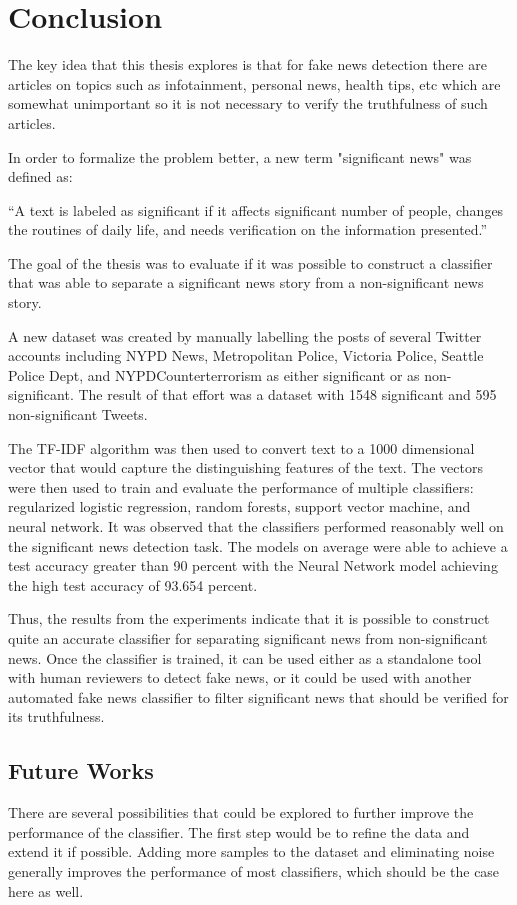\chapter{Conclusion}\label{conclusion}
The key idea that this thesis explores is that for fake news detection there are articles on topics such as infotainment, personal news, health tips, etc which are somewhat unimportant so it is not necessary to verify the truthfulness of such articles.

In order to formalize the problem better, a new term "significant news" was defined as:

\enquote{A text is labeled as significant if it affects significant number of people, changes the routines of daily life, and needs verification on the information presented.}

The goal of the thesis was to evaluate if it was possible to construct a classifier that was able to separate a significant news story from a non-significant news story.

A new dataset was created by manually labelling the posts of several Twitter accounts including NYPD News, Metropolitan Police, Victoria Police, Seattle Police Dept, and NYPDCounterterrorism as either significant or as non-significant. The result of that effort was a dataset with 1548 significant and 595 non-significant Tweets.

The TF-IDF algorithm was then used to convert text to a 1000 dimensional vector that would capture the distinguishing features of the text. The vectors were then used to train and evaluate the performance of multiple classifiers: regularized logistic regression, random forests, support vector machine, and neural network. It was observed that the classifiers performed reasonably well on the significant news detection task. The models on average were able to achieve a test accuracy greater than 90 percent with the Neural Network model achieving the high test accuracy of 93.654 percent.

Thus, the results from the experiments indicate that it is possible to construct quite an accurate classifier for separating significant news from non-significant news. Once the classifier is trained, it can be used either as a standalone tool with human reviewers to detect fake news, or it could be used with another automated fake news classifier to filter significant news that should be verified for its truthfulness.

\section{Future Works}
There are several possibilities that could be explored to further improve the performance of the classifier. The first step would be to refine the data and extend it if possible. Adding more samples to the dataset and eliminating noise generally improves the performance of most classifiers, which should be the case here as well.

